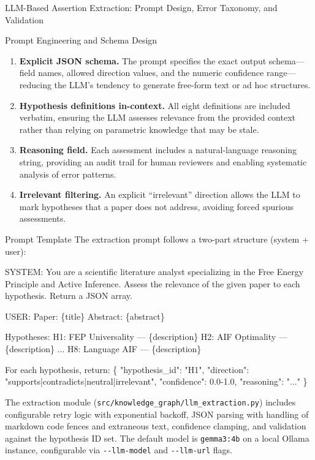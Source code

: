 \documentclass[
  ignorenonframetext,
]{beamer}
\newenvironment{Shaded}{}{}
\newcommand{\NormalTok}[1]{#1}
\begin{document}
\begin{frame}[fragile]{LLM-Based Assertion Extraction: Prompt Design,
Error Taxonomy, and Validation \label{sec:extraction_pipeline}}
\begin{block}{Prompt Engineering and Schema Design}
\begin{enumerate}
\item
  \textbf{Explicit JSON schema.} The prompt specifies the exact output
  schema---field names, allowed direction values, and the numeric
  confidence range---reducing the LLM's tendency to generate free-form
  text or ad hoc structures.
\item
  \textbf{Hypothesis definitions in-context.} All eight definitions are
  included verbatim, ensuring the LLM assesses relevance from the
  provided context rather than relying on parametric knowledge that may
  be stale.
\item
  \textbf{Reasoning field.} Each assessment includes a natural-language
  reasoning string, providing an audit trail for human reviewers and
  enabling systematic analysis of error patterns.
\item
  \textbf{Irrelevant filtering.} An explicit ``irrelevant'' direction
  allows the LLM to mark hypotheses that a paper does not address,
  avoiding forced spurious assessments.
\end{enumerate}

\begin{block}{Prompt Template}
\protect{}\label{prompt-template}
The extraction prompt follows a two-part structure (system + user):

\begin{Shaded}
\begin{Highlighting}[]
\NormalTok{SYSTEM: You are a scientific literature analyst specializing in the}
\NormalTok{Free Energy Principle and Active Inference. Assess the relevance of}
\NormalTok{the given paper to each hypothesis. Return a JSON array.}

\NormalTok{USER:}
\NormalTok{Paper: \{title\}}
\NormalTok{Abstract: \{abstract\}}

\NormalTok{Hypotheses:}
\NormalTok{H1: FEP Universality — \{description\}}
\NormalTok{H2: AIF Optimality — \{description\}}
\NormalTok{...}
\NormalTok{H8: Language AIF — \{description\}}

\NormalTok{For each hypothesis, return:}
\NormalTok{\{}
\NormalTok{  "hypothesis\_id": "H1",}
\NormalTok{  "direction": "supports|contradicts|neutral|irrelevant",}
\NormalTok{  "confidence": 0.0{-}1.0,}
\NormalTok{  "reasoning": "..."}
\NormalTok{\}}
\end{Highlighting}
\end{Shaded}

The extraction module (\texttt{src/knowledge\_graph/llm\_extraction.py})
includes configurable retry logic with exponential backoff, JSON parsing
with handling of markdown code fences and extraneous text, confidence
clamping, and validation against the hypothesis ID set. The default
model is \texttt{gemma3:4b} on a local Ollama instance, configurable via
\texttt{-\/-llm-model} and \texttt{-\/-llm-url} flags.
\end{block}
\end{block}


\end{frame}
\end{document}
